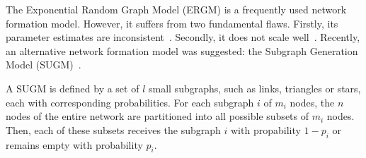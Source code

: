 \documentclass[conference]{IEEEtran}
\begin{document}
The Exponential Random Graph Model (ERGM) is a frequently used network formation model. However, it suffers from two fundamental flaws. Firstly, its parameter estimates are inconsistent~\cite{Shalizi2013,Chatterjee2013}. Secondly, it does not scale well~\cite{Bhamidi2011}. Recently, an alternative network formation model was suggested: the Subgraph Generation Model (SUGM)~\cite{Chandrasekhar2014,Chandrasekhar2015,Chandrasekhar2016}.

A SUGM is defined by a set of $l$ small subgraphs, such as links, triangles or stars, each with corresponding probabilities. For each subgraph $i$ of $m_{i}$ nodes, the $n$ nodes of the entire network are partitioned into all possible subsets of $m_{i}$ nodes. Then, each of these subsets receives the subgraph $i$ with propability $1-p_{i}$ or remains empty with probability $p_{i}$.
\end{document}
